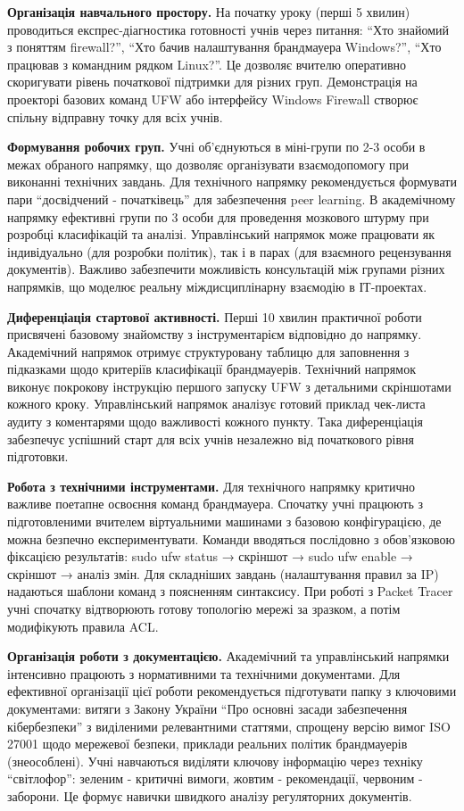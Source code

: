 \textbf{Організація навчального простору.} На початку уроку (перші 5 хвилин) проводиться експрес-діагностика готовності учнів через питання: ``Хто знайомий з поняттям firewall?'', ``Хто бачив налаштування брандмауера Windows?'', ``Хто працював з командним рядком Linux?''. Це дозволяє вчителю оперативно скоригувати рівень початкової підтримки для різних груп. Демонстрація на проекторі базових команд UFW або інтерфейсу Windows Firewall створює спільну відправну точку для всіх учнів.

\textbf{Формування робочих груп. }Учні об'єднуються в міні-групи по 2-3 особи в межах обраного напрямку, що дозволяє організувати взаємодопомогу при виконанні технічних завдань. Для технічного напрямку рекомендується формувати пари ``досвідчений - початківець'' для забезпечення peer learning. В академічному напрямку ефективні групи по 3 особи для проведення мозкового штурму при розробці класифікацій та аналізі. Управлінський напрямок може працювати як індивідуально (для розробки політик), так і в парах (для взаємного рецензування документів). Важливо забезпечити можливість консультацій між групами різних напрямків, що моделює реальну міждисциплінарну взаємодію в ІТ-проектах.

\textbf{Диференціація стартової активності.} Перші 10 хвилин практичної роботи присвячені базовому знайомству з інструментарієм відповідно до напрямку. Академічний напрямок отримує структуровану таблицю для заповнення з підказками щодо критеріїв класифікації брандмауерів. Технічний напрямок виконує покрокову інструкцію першого запуску UFW з детальними скріншотами кожного кроку. Управлінський напрямок аналізує готовий приклад чек-листа аудиту з коментарями щодо важливості кожного пункту. Така диференціація забезпечує успішний старт для всіх учнів незалежно від початкового рівня підготовки.

\textbf{Робота з технічними інструментами.} Для технічного напрямку критично важливе поетапне освоєння команд брандмауера. Спочатку учні працюють з підготовленими вчителем віртуальними машинами з базовою конфігурацією, де можна безпечно експериментувати. Команди вводяться послідовно з обов'язковою фіксацією результатів: sudo ufw status → скріншот → sudo ufw enable → скріншот → аналіз змін. Для складніших завдань (налаштування правил за IP) надаються шаблони команд з поясненням синтаксису. При роботі з Packet Tracer учні спочатку відтворюють готову топологію мережі за зразком, а потім модифікують правила ACL. 

\textbf{Організація роботи з документацією. }Академічний та управлінський напрямки інтенсивно працюють з нормативними та технічними документами. Для ефективної організації цієї роботи рекомендується підготувати папку з ключовими документами: витяги з Закону України ``Про основні засади забезпечення кібербезпеки'' з виділеними релевантними статтями, спрощену версію вимог ISO 27001 щодо мережевої безпеки, приклади реальних політик брандмауерів (знеособлені). Учні навчаються виділяти ключову інформацію через техніку ``світлофор'': зеленим - критичні вимоги, жовтим - рекомендації, червоним - заборони. Це формує навички швидкого аналізу регуляторних документів.

